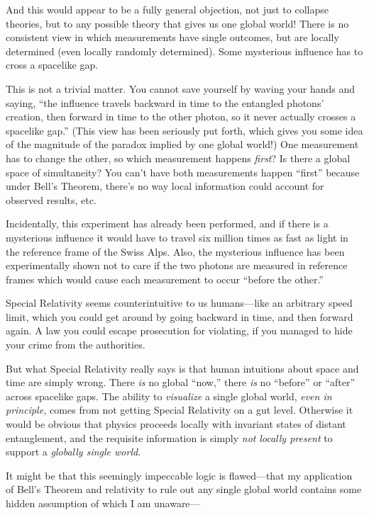 {
 And this would appear to be a fully general objection, not just to
collapse theories, but to any possible theory that gives us one global
world! There is no consistent view in which measurements have single
outcomes, but are locally determined (even locally randomly
determined). Some mysterious influence has to cross a spacelike gap.}

{
 This is not a trivial matter. You cannot save yourself by waving
your hands and saying, ``the influence travels
backward in time to the entangled photons' creation,
then forward in time to the other photon, so it never actually crosses
a spacelike gap.'' (This view has been seriously put
forth, which gives you some idea of the magnitude of the paradox
implied by one global world!) One measurement has to change the other,
so which measurement happens \textit{first}? Is there a global space of
simultaneity? You can't have both measurements happen
``first'' because under
Bell's Theorem, there's no way local
information could account for observed results, etc.}

{
 Incidentally, this experiment has already been performed, and if
there is a mysterious influence it would have to travel six million
times as fast as light in the reference frame of the Swiss Alps. Also,
the mysterious influence has been experimentally shown not to care if
the two photons are measured in reference frames which would cause each
measurement to occur ``before the
other.''}

{
 Special Relativity seems counterintuitive to us humans---like an
arbitrary speed limit, which you could get around by going backward in
time, and then forward again. A law you could escape prosecution for
violating, if you managed to hide your crime from the authorities.}

{
 But what Special Relativity really says is that human intuitions
about space and time are simply wrong. There \textit{is} no global
``now,'' there \textit{is} no
``before'' or
``after'' across spacelike gaps. The
ability to \textit{visualize} a single global world, \textit{even in
principle,} comes from not getting Special Relativity on a gut level.
Otherwise it would be obvious that physics proceeds locally with
invariant states of distant entanglement, and the requisite information
is simply \textit{not} \textit{locally present} to support a
\textit{globally single world}.}

{
 It might be that this seemingly impeccable logic is flawed---that
my application of Bell's Theorem and relativity to rule
out any single global world contains some hidden assumption of which I
am unaware---}

